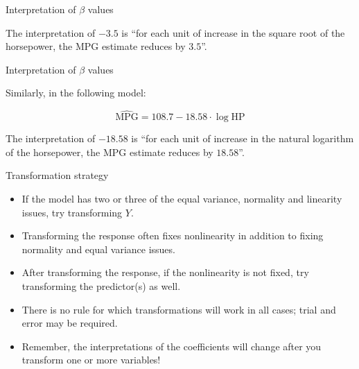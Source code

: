 \documentclass{beamer}\usepackage[]{graphicx}\usepackage[]{color}
\begin{document}
\begin{darkframes}
\begin{frame}[fragile]{Interpretation of $\beta$ values}
\begin{center}
        The interpretation of $- 3.5$ is ``for each unit of increase \alert{in the square root of the horsepower}, the MPG estimate reduces by $ 3.5$''.
        
        \lc
        
      
      \end{center}
    \end{frame}
  
  
  \begin{frame}[fragile]{Interpretation of $\beta$ values}

      \begin{center} 
        Similarly, in the following model: \bigskip
        
        \[
        \widehat{\text{MPG}} = 108.7 
        - 18.58 \cdot\log{\text{HP}}
        \] \bigskip \pause
        
        The interpretation of $- 18.58$ is ``for each unit of increase \alert{in the natural logarithm of the horsepower}, the MPG estimate reduces by $ 18.58$''.
        
        \lc
        
      
      \end{center}
    \end{frame}

  
  
  
    \begin{frame}[fragile]{Transformation strategy}
      \begin{itemize}[<+->]
        \item If the model has two or three of the equal variance, normality and linearity issues, try transforming $Y$.
        \item Transforming the response often fixes nonlinearity in addition to fixing normality and equal variance issues.
        \item After transforming the response, if the nonlinearity is not fixed, try transforming the predictor(s) as well.
        \item There is no rule for which transformations will work in all cases; trial and error may be required.
        \item Remember, the interpretations of the coefficients will change after you transform one or more variables!
      \end{itemize}
    \end{frame}
  

  \end{darkframes}

  
\end{document}
